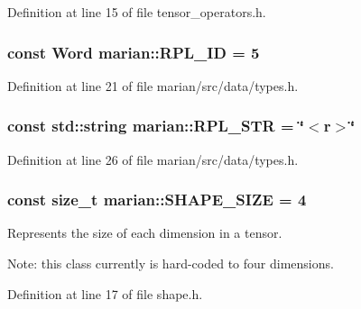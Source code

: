 Definition at line 15 of file tensor\+\_\+operators.\+h.

\subsubsection[{\texorpdfstring{R\+P\+L\+\_\+\+ID}{RPL_ID}}]{\setlength{\rightskip}{0pt plus 5cm}const {\bf Word} marian\+::\+R\+P\+L\+\_\+\+ID = 5}\hypertarget{namespacemarian_ae421bed2a0160f392a3c21bed9cabc73}{}\label{namespacemarian_ae421bed2a0160f392a3c21bed9cabc73}


Definition at line 21 of file marian/src/data/types.\+h.

\subsubsection[{\texorpdfstring{R\+P\+L\+\_\+\+S\+TR}{RPL_STR}}]{\setlength{\rightskip}{0pt plus 5cm}const std\+::string marian\+::\+R\+P\+L\+\_\+\+S\+TR = \char`\"{}$<$r$>$\char`\"{}}\hypertarget{namespacemarian_a0609886bc1d9c2f4fc75e5e9fc6905ad}{}\label{namespacemarian_a0609886bc1d9c2f4fc75e5e9fc6905ad}


Definition at line 26 of file marian/src/data/types.\+h.

\subsubsection[{\texorpdfstring{S\+H\+A\+P\+E\+\_\+\+S\+I\+ZE}{SHAPE_SIZE}}]{\setlength{\rightskip}{0pt plus 5cm}const size\+\_\+t marian\+::\+S\+H\+A\+P\+E\+\_\+\+S\+I\+ZE = 4}\hypertarget{namespacemarian_a3df798260496f2cf8c2d39272ce213ad}{}\label{namespacemarian_a3df798260496f2cf8c2d39272ce213ad}


Represents the size of each dimension in a tensor. 

Note\+: this class currently is hard-\/coded to four dimensions. 

Definition at line 17 of file shape.\+h.

